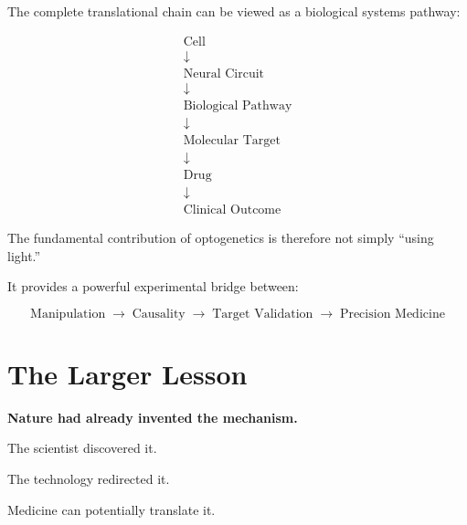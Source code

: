 \documentclass[11pt]{article}
\begin{document}
The complete translational chain can be viewed as a biological
systems pathway:

\begin{center}
\[
\boxed{
\begin{array}{c}
\text{Cell} \\ \downarrow \\
\text{Neural Circuit} \\ \downarrow \\
\text{Biological Pathway} \\ \downarrow \\
\text{Molecular Target} \\ \downarrow \\
\text{Drug} \\ \downarrow \\
\text{Clinical Outcome}
\end{array}
}
\]
\end{center}

The fundamental contribution of optogenetics is therefore not
simply ``using light.''

It provides a powerful experimental bridge between:

\[
\boxed{
\text{Manipulation}
\;\longrightarrow\;
\text{Causality}
\;\longrightarrow\;
\text{Target Validation}
\;\longrightarrow\;
\text{Precision Medicine}
}
\]

\section{The Larger Lesson}

\begin{discoverybox}
\begin{center}
{\color{Maroon}\Large\bfseries
Nature had already invented the mechanism.}

\vspace{0.25cm}

The scientist discovered it.

\vspace{0.15cm}

The technology redirected it.

\vspace{0.15cm}

Medicine can potentially translate it.
\end{center}
\end{discoverybox}

\vspace{0.4cm}
\end{document}
